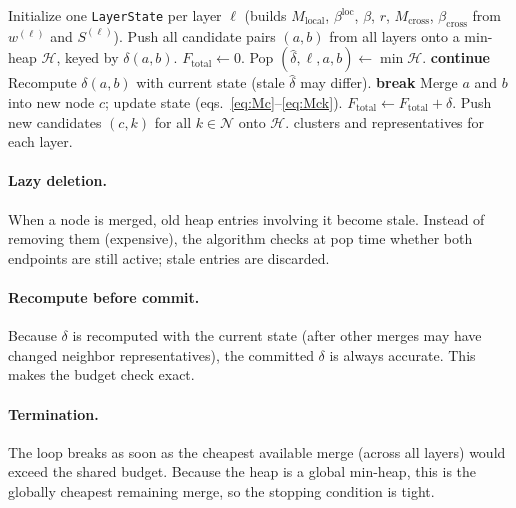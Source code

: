\documentclass[11pt]{article}
\begin{document}
\begin{algorithm}[h]
\caption{Multi-layer loss coloring with shared budget}
\begin{algorithmic}[1]
  \State Initialize one \texttt{LayerState} per layer $\ell$ (builds $M_{\mathrm{local}}$,
         $\beta^{\mathrm{loc}}$, $\beta$, $r$, $M_{\mathrm{cross}}$, $\beta_{\mathrm{cross}}$
         from $w^{(\ell)}$ and $S^{(\ell)}$).
  \State Push all candidate pairs $(a, b)$ from all layers onto a min-heap
         $\mathcal{H}$, keyed by $\delta(a,b)$.
  \State $F_{\mathrm{total}} \gets 0$.
    \State Pop $(\hat\delta, \ell, a, b) \gets \min \mathcal{H}$.
     \textbf{continue} \EndIf
    \State Recompute $\delta(a,b)$ with current state (stale $\hat\delta$ may differ).
     \textbf{break} \EndIf
    \State Merge $a$ and $b$ into new node $c$; update state (eqs.\ \eqref{eq:Mc}--\eqref{eq:Mck}).
    \State $F_{\mathrm{total}} \gets F_{\mathrm{total}} + \delta$.
    \State Push new candidates $(c, k)$ for all $k \in \mathcal{N}$ onto $\mathcal{H}$.
  \EndWhile
  \State \Return clusters and representatives for each layer.
\end{algorithmic}
\end{algorithm}

\paragraph{Lazy deletion.} When a node is merged, old heap entries involving
it become stale. Instead of removing them (expensive), the algorithm checks
at pop time whether both endpoints are still active; stale entries are discarded.

\paragraph{Recompute before commit.} Because $\delta$ is recomputed with the
current state (after other merges may have changed neighbor representatives),
the committed $\delta$ is always accurate. This makes the budget check exact.

\paragraph{Termination.}
The loop breaks as soon as the cheapest available merge (across all layers)
would exceed the shared budget. Because the heap is a global min-heap, this
is the globally cheapest remaining merge, so the stopping condition is tight.
\end{document}
